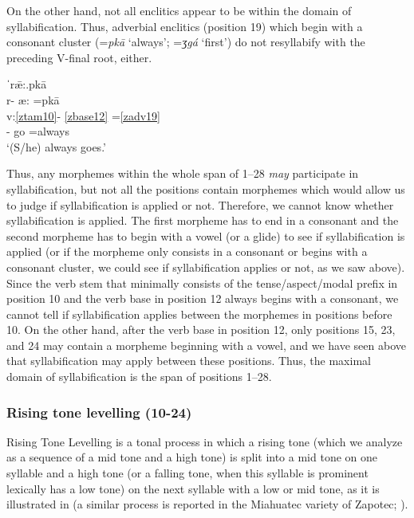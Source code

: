 \documentclass[output=paper]{langscibook}
\begin{document}
On the other hand, not all enclitics appear to be within the domain of syllabification. Thus, adverbial enclitics (position 19) which begin with a consonant cluster (=\textit{pkā} `always'; =\textit{ʒgá} `first') do not resyllabify with the preceding V-final root, either.

\ea\label{ex:key:zap:66}
{ˈrǣ:.pkā}\\
\glll r- æ: =pkā\\
v:\ref{ztam10}- \ref{zbase12} =\ref{zadv19} \\
\Hab{}- go =always\\
\glt  `(S/he) always goes.'
\z

Thus, any morphemes within the whole span of 1--28 \textit{may} participate in syllabification, but not all the positions contain morphemes which would allow us to judge if syllabification is applied or not. Therefore, we cannot know whether syllabification is applied. The first morpheme has to end in a consonant and the second morpheme has to begin with a vowel (or a glide) to see if syllabification is applied (or if the morpheme only consists in a consonant or begins with a consonant cluster, we could see if syllabification applies or not, as we saw above). Since the verb stem that minimally consists of the tense/aspect/modal prefix in position 10 and the verb base in position 12 always begins with a consonant, we cannot tell if syllabification applies between the morphemes in positions before 10. On the other hand, after the verb base in position 12, only positions 15, 23, and 24 may contain a morpheme beginning with a vowel, and we have seen above that syllabification may apply between these positions. Thus, the maximal domain of syllabification is the span of positions 1--28.

\subsubsection{Rising tone levelling (10-24)} 
\label{bkm:Ref90291469}

Rising Tone Levelling is a tonal process in which a rising tone (which we analyze as a sequence of a mid tone and a high tone) is split into a mid tone on one syllable and a high tone (or a falling tone, when this syllable is prominent lexically has a low tone) on the next syllable with a low or mid tone, as it is illustrated in  (a similar process is reported in the Miahuatec variety of Zapotec; \citealt{Hernandez-Luna2021}).
\end{document}
